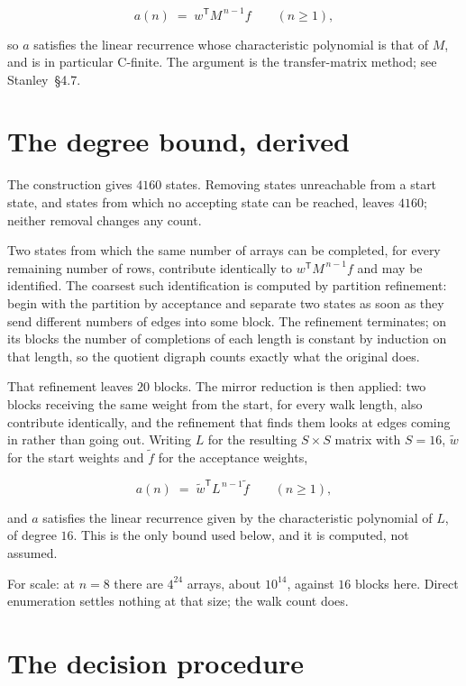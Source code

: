 \documentclass[11pt]{article}
\theoremstyle{definition}
\begin{document}
\[a(n) \;=\; w^{\mathsf T} M^{\,n-1} f \qquad (n \ge 1),\]

so $a$ satisfies the linear recurrence whose characteristic polynomial is that of $M$, and is in particular C-finite. The argument is the transfer-matrix method; see Stanley~\S4.7.

\section{The degree bound, derived}

The construction gives $4160$ states. Removing states unreachable from a start state, and states from which no accepting state can be reached, leaves $4160$; neither removal changes any count.

Two states from which the same number of arrays can be completed, for every remaining number of rows, contribute identically to $w^{\mathsf T}M^{\,n-1}f$ and may be identified. The coarsest such identification is computed by partition refinement: begin with the partition by acceptance and separate two states as soon as they send different numbers of edges into some block. The refinement terminates; on its blocks the number of completions of each length is constant by induction on that length, so the quotient digraph counts exactly what the original does.

That refinement leaves $20$ blocks. The mirror reduction is then applied: two blocks receiving the same weight from the start, for every walk length, also contribute identically, and the refinement that finds them looks at edges coming in rather than going out. Writing $L$ for the resulting $S \times S$ matrix with $S = 16$, $\tilde w$ for the start weights and $\tilde f$ for the acceptance weights,

\[a(n) \;=\; \tilde w^{\mathsf T} L^{\,n-1} \tilde f \qquad (n \ge 1),\]

and $a$ satisfies the linear recurrence given by the characteristic polynomial of $L$, of degree $16$. This is the only bound used below, and it is computed, not assumed.

For scale: at $n = 8$ there are $4^{24}$ arrays, about $10^{14}$, against $16$ blocks here. Direct enumeration settles nothing at that size; the walk count does.

\section{The decision procedure}
\end{document}
